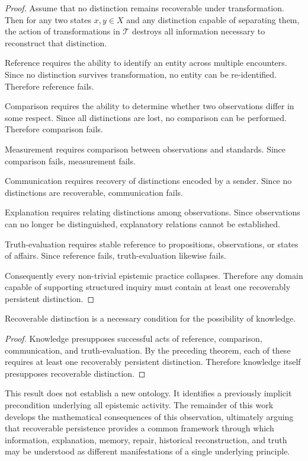 \documentclass[12pt,oneside]{article}
\theoremstyle{definition}
\begin{document}
\begin{proof}
Assume that no distinction remains recoverable under transformation. Then for any two states \(x,y\in X\) and any distinction capable of separating them, the action of transformations in \(\mathcal{T}\) destroys all information necessary to reconstruct that distinction.

Reference requires the ability to identify an entity across multiple encounters. Since no distinction survives transformation, no entity can be re-identified. Therefore reference fails.

Comparison requires the ability to determine whether two observations differ in some respect. Since all distinctions are lost, no comparison can be performed. Therefore comparison fails.

Measurement requires comparison between observations and standards. Since comparison fails, measurement fails.

Communication requires recovery of distinctions encoded by a sender. Since no distinctions are recoverable, communication fails.

Explanation requires relating distinctions among observations. Since observations can no longer be distinguished, explanatory relations cannot be established.

Truth-evaluation requires stable reference to propositions, observations, or states of affairs. Since reference fails, truth-evaluation likewise fails.

Consequently every non-trivial epistemic practice collapses. Therefore any domain capable of supporting structured inquiry must contain at least one recoverably persistent distinction.
\end{proof}

\begin{corollary}
Recoverable distinction is a necessary condition for the possibility of knowledge.
\end{corollary}

\begin{proof}
Knowledge presupposes successful acts of reference, comparison, communication, and truth-evaluation. By the preceding theorem, each of these requires at least one recoverably persistent distinction. Therefore knowledge itself presupposes recoverable distinction.
\end{proof}

This result does not establish a new ontology. It identifies a previously implicit precondition underlying all epistemic activity. The remainder of this work develops the mathematical consequences of this observation, ultimately arguing that recoverable persistence provides a common framework through which information, explanation, memory, repair, historical reconstruction, and truth may be understood as different manifestations of a single underlying principle.
\end{document}
